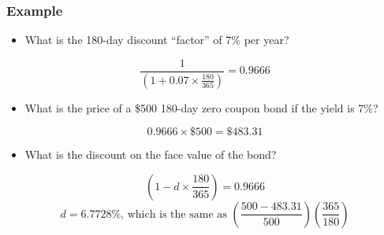 \documentclass[10pt]{beamer}
\begin{document}
	
	
	\begin{frame}
		\frametitle{Example}
		
		\begin{itemize}
			\item What is the 180-day discount ``factor'' of 7\% per year?
		\end{itemize}	
		$$
		\frac{1}{\left( 1+ 0.07 \times \frac{180}{365} \right) } = 0.9666 
		$$
		
		\begin{itemize}
			\item What is the price of a \$500 180-day zero coupon bond if the yield is 7\%?
		\end{itemize}	
		$$
		0.9666 \times \$500 = \$483.31
		$$		
		
		\begin{itemize}
			\item What is the discount on the face value of the bond?
		\end{itemize}	
		$$
		\left(1 - d \times \frac{180}{365} \right) = 0.9666
		$$	
		$$
		d = 6.7728\% \text{, which is the same as } \left( \frac{500-483.31}{500} \right) \left( \frac{365}{180} \right)
		$$
	\end{frame}
	
	
	
\end{document}

